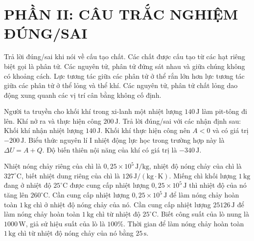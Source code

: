 \section*{PHẦN II: CÂU TRẮC NGHIỆM ĐÚNG/SAI}


\begin{ex}
	Trả lời đúng/sai khi nói về cấu tạo chất.
	\choiceTF
	{\True Các chất được cấu tạo từ các hạt riêng biệt gọi là phân tử.}
	{Các nguyên tử, phân tử đứng sát nhau và giữa chúng không có khoảng cách.}
	{\True Lực tương tác giữa các phân tử ở thể rắn lớn hơn lực tương tác giữa các phân tử ở thể lỏng và thể khí.}
	{\True Các nguyên tử, phân tử chất lỏng dao động xung quanh các vị trí cân bằng không cố định.}
\end{ex}


\begin{ex}
	Người ta truyền cho khối khí trong xi-lanh một nhiệt lượng $140\,\mathrm{J}$ làm pit-tông đi lên. Khí nở ra và thực hiện công $200\,\mathrm{J}$. Trả lời đúng/sai với các nhận định sau:
	\choiceTF
	{\True Khối khí nhận nhiệt lượng $140\,\mathrm{J}$.}
	{\True Khối khí thực hiện công nên $A<0$ và có giá trị $-200\,\mathrm{J}$.}
	{\True Biểu thức nguyên lí I nhiệt động lực học trong trường hợp này là $\Delta U=A+Q$.}
	{Độ biến thiên nội năng của khí có giá trị là $-340\,\mathrm{J}$.}
\end{ex}

\begin{ex}
	Nhiệt nóng chảy riêng của chì là $0{,}25\times10^5\,\mathrm{J/kg}$, nhiệt độ nóng chảy của chì là $327^\circ\mathrm{C}$, biết nhiệt dung riêng của chì là $126\,\mathrm{J/(kg\cdot K)}$.
	\choiceTF
	{Miếng chì khối lượng $1\,\mathrm{kg}$ đang ở nhiệt độ $25^\circ\mathrm{C}$ được cung cấp nhiệt lượng $0{,}25\times10^5\,\mathrm{J}$ thì nhiệt độ của nó tăng lên $260^\circ\mathrm{C}$.}
	{\True Cần cung cấp nhiệt lượng $0{,}25\times10^5\,\mathrm{J}$ để làm nóng chảy hoàn toàn $1\,\mathrm{kg}$ chì ở nhiệt độ nóng chảy của nó.}
	{Cần cung cấp nhiệt lượng $25126\,\mathrm{J}$ để làm nóng chảy hoàn toàn $1\,\mathrm{kg}$ chì từ nhiệt độ $25^\circ\mathrm{C}$.}
	{\True Biết công suất của lò nung là $1000\,\mathrm{W}$, giả sử hiệu suất của lò là $100\%$. Thời gian để làm nóng chảy hoàn toàn $1\,\mathrm{kg}$ chì từ nhiệt độ nóng chảy của nó bằng $25\,\mathrm{s}$.}
\end{ex}

